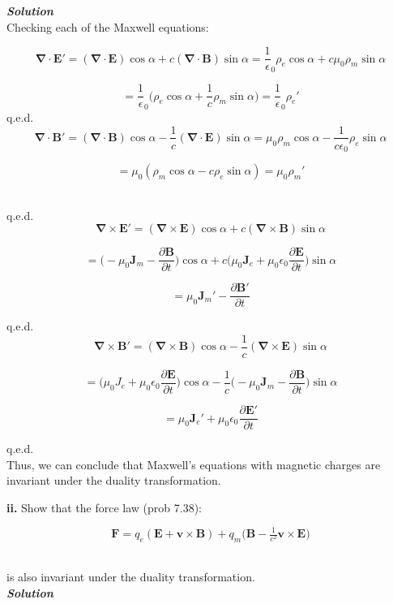\documentclass[9pt]{extarticle}
\renewcommand{\v}[1]{{\bm #1}}
\newcommand{\bfit}[1]{\textbf{\textit{#1}}}
\newcommand{\pd}[2]{\frac{\partial #1}{\partial #2}}
\renewcommand{\div}{\boldsymbol \nabla \cdot}
\renewcommand{\curl}{\boldsymbol \nabla \times}
\newcommand{\eo}{\epsilon_0}
\newcommand{\muo}{\mu_0}
\begin{document}
\begin{multicols*}{2}
{\bfit{Solution}} \\ 

Checking each of the Maxwell equations:

$$\div \v E' = (\div \v E) \cos\alpha + c(\div \v B)\sin\alpha = \frac 1 \eo \rho_e \cos\alpha + c\muo \rho_m\sin\alpha$$

$$= \frac 1\eo \bigg( \rho_e \cos\alpha + \frac 1c \rho_m\sin\alpha \bigg) = \frac 1\eo \rho_e'$$ 
q.e.d. \\ 

$$\div \v B' = (\div \v B)\cos\alpha - \frac 1c (\div \v E)\sin\alpha = \muo \rho_m\cos\alpha - \frac{1}{c\eo}\rho_e\sin\alpha$$

$$= \muo(\rho_m \cos\alpha - c\rho_e\sin\alpha) = \muo\rho_m'$$ \ 

q.e.d. \\ 

$$\curl \v E' = (\curl \v E)\cos\alpha + c(\curl \v B)\sin\alpha$$

$$= \bigg(-\muo \v J_m - \pd{\v B}{t} \bigg) \cos\alpha + c\bigg( \muo \v J_e + \muo \eo \pd{\v E}{t} \bigg) \sin\alpha$$

$$= \muo \v J_m' - \pd{\v B'}{t}$$ 

q.e.d. \\ 

$$\curl \v B' = (\curl \v B)\cos\alpha - \frac 1c (\curl \v E)\sin\alpha$$

$$= \bigg(\muo J_e + \muo\eo \pd{\v E}{t} \bigg) \cos\alpha - \frac 1c \bigg(-\muo \v J_m -\pd{\v B}{t} \bigg) \sin\alpha$$ 

$$= \muo \v J_e' + \muo\eo \pd{\v E'}{t}$$

q.e.d. \\ 

Thus, we can conclude that Maxwell's equations with magnetic charges are invariant under the duality transformation. \\ 




\dotfill 

\hfill 

{\bf ii.} Show that the force law (prob 7.38):

$$\v F = q_e(\v E + \v v \times \v B) + q_m \big( \v B - \tfrac{1}{c^2}\v v \times \v E \big)$$ \ 

is also invariant under the duality transformation. \\ 

{\bfit{Solution}} \\ 


\end{multicols*}
\end{document}

